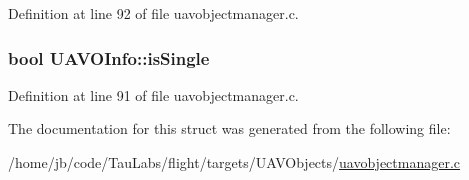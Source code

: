 \-Definition at line 92 of file uavobjectmanager.\-c.

\hypertarget{struct_u_a_v_o_info_ac17e3b9e0eaf982bbbba5545026f7bb4}{
\subsubsection[{is\-Single}]{\setlength{\rightskip}{0pt plus 5cm}bool {\bf \-U\-A\-V\-O\-Info\-::is\-Single}}}\label{struct_u_a_v_o_info_ac17e3b9e0eaf982bbbba5545026f7bb4}


\-Definition at line 91 of file uavobjectmanager.\-c.



\-The documentation for this struct was generated from the following file\-:\begin{DoxyCompactItemize}
\item 
/home/jb/code/\-Tau\-Labs/flight/targets/\-U\-A\-V\-Objects/\hyperlink{uavobjectmanager_8c}{uavobjectmanager.\-c}\end{DoxyCompactItemize}
